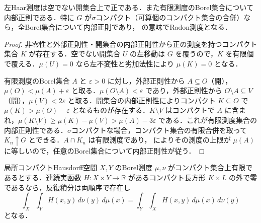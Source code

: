 \begin{prop}[Haar測度の正値性と内部正則性]
左Haar測度は空でない開集合上で正である．また有限測度のBorel集合について内部正則である．特に $G$ が$\sigma$コンパクト（可算個のコンパクト集合の合併）なら，全Borel集合について内部正則であり， の意味でRadon測度となる．
\end{prop}
\begin{proof}
非零性と外部正則性・開集合の内部正則性から正の測度を持つコンパクト集合 $K$ が存在する．空でない開集合 $U$ の左移動は $G$ を覆うので，$K$ を有限個で覆える．$\mu(U)=0$ なら左不変性と劣加法性により $\mu(K)=0$ となる．

有限測度のBorel集合 $A$ と $\varepsilon>0$ に対し，外部正則性から $A\subseteq O$（開），$\mu(O)<\mu(A)+\varepsilon$ と取る．$\mu(O\setminus A)<\varepsilon$ であり，外部正則性から $O\setminus A\subseteq V$（開），$\mu(V)<2\varepsilon$ と取る．開集合の内部正則性によりコンパクト $K\subseteq O$ で $\mu(K)>\mu(O)-\varepsilon$ となるものが存在する．$K\setminus V$ はコンパクトで $A$ に含まれ，$\mu(K\setminus V)\geq\mu(K)-\mu(V)>\mu(A)-3\varepsilon$ である．これが有限測度集合の内部正則性である．$\sigma$コンパクトな場合，コンパクト集合の有限合併を取って $K_n\uparrow G$ とできる．$A\cap K_n$ は有限測度であり， によりその測度の上限が $\mu(A)$ に等しいので，任意のBorel集合について内部正則性が従う．
\end{proof}
\begin{prop}[コンパクト台函数の反復積分]
局所コンパクトHausdorff空間 $X,Y$ のBorel測度 $\mu,\nu$ がコンパクト集合上有限であるとする．連続実函数 $H:X\times Y\to\mathbb R$ があるコンパクト長方形 $K\times L$ の外で零であるなら，反復積分は両順序で存在し
\[
\int_X\int_Y H(x,y)\,d\nu(y)\,d\mu(x)=\int_Y\int_X H(x,y)\,d\mu(x)\,d\nu(y)
\]
となる．
\end{prop}
